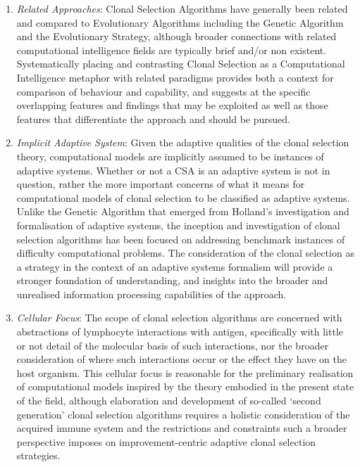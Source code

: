 \begin{enumerate}
	\item \emph{Related Approaches}: Clonal Selection Algorithms have generally been related and compared to Evolutionary Algorithms including the Genetic Algorithm and the Evolutionary Strategy, although broader connections with related computational intelligence fields are typically brief and/or non existent. Systematically placing and contrasting Clonal Selection as a Computational Intelligence metaphor with related paradigms provides both a context for comparison of behaviour and capability, and suggests at the specific overlapping features and findings that may be exploited as well as those features that differentiate the approach and should be pursued.

	\item \emph{Implicit Adaptive System}: Given the adaptive qualities of the clonal selection theory, computational models are implicitly assumed to be instances of adaptive systems. Whether or not a CSA is an adaptive system is not in question, rather the more important concerns of what it means for computational models of clonal selection to be classified as adaptive systems. Unlike the Genetic Algorithm that emerged from Holland's investigation and formalisation of adaptive systems, the inception and investigation of clonal selection algorithms has been focused on addressing benchmark instances of difficulty computational problems. The consideration of the clonal selection as a strategy in the context of an adaptive systems formalism will provide a stronger foundation of understanding, and insights into the broader and unrealised information processing capabilities of the approach.
	
	\item \emph{Cellular Focus}: The scope of clonal selection algorithms are concerned with abstractions of lymphocyte interactions with antigen, specifically with little or not detail of the molecular basis of such interactions, nor the broader consideration of where such interactions occur or the effect they have on the host organism. This cellular focus is reasonable for the preliminary realisation of computational models inspired by the theory embodied in the present state of the field, although elaboration and development of so-called `second generation' clonal selection algorithms requires a holistic consideration of the acquired immune system and the restrictions and constraints such a broader perspective imposes on improvement-centric adaptive clonal selection strategies.
\end{enumerate}



